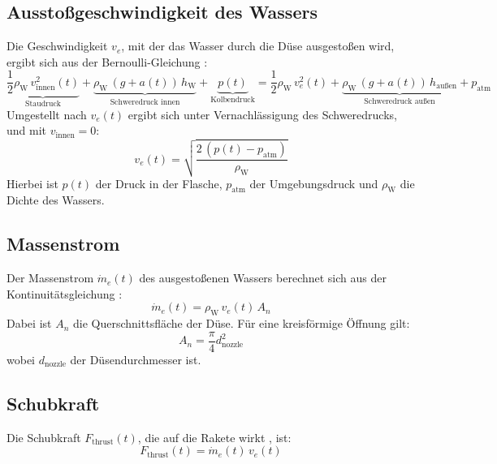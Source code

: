 \documentclass{SimSemBericht} %
\begin{document}
\subsection{Ausstoßgeschwindigkeit des Wassers}
Die Geschwindigkeit \(v_e\), mit der das Wasser durch die Düse ausgestoßen wird, ergibt sich aus der Bernoulli-Gleichung \cite{formelsammlung2024}: %
\begin{equation*}
    \underbrace{\frac{1}{2} \rho_{\mathrm{W}} \, v_{\text{innen}}^2(t)}_{\text{Staudruck}}
    + \underbrace{\rho_{\mathrm{W}} \, (g + a(t)) \, h_{\mathrm{W}}}_{\text{Schweredruck innen}}
    + \underbrace{p(t)}_{\text{Kolbendruck}}
    = \frac{1}{2} \rho_{\mathrm{W}} \, v_e^2(t)
    + \underbrace{\rho_{\mathrm{W}} \, (g + a(t)) \, h_{\text{außen}}}_{\text{Schweredruck außen}}
    + p_{\text{atm}}
\end{equation*}
Umgestellt nach \(v_e(t)\) ergibt sich unter Vernachlässigung des Schweredrucks, und mit \(v_{\text{innen}} = 0\):
\begin{equation}
v_e(t) = \sqrt{\frac{2\,(p(t) - p_{\text{atm}})}{\rho_{\mathrm{W}}}}
\end{equation}
Hierbei ist \(p(t)\) der Druck in der Flasche, \(p_{\text{atm}}\) der Umgebungsdruck und \(\rho_{\mathrm{W}}\) die Dichte des Wassers.

\subsection{Massenstrom}
Der Massenstrom \(\dot{m}_e(t)\) des ausgestoßenen Wassers berechnet sich aus der Kontinuitätsgleichung \cite{formelsammlung2024}: %
\begin{equation}
\dot{m}_e(t) = \rho_{\mathrm{W}} \, v_e(t) \, A_n
\end{equation}
Dabei ist \(A_n\) die Querschnittsfläche der Düse. Für eine kreisförmige Öffnung gilt:
\begin{equation*}
A_n = \frac{\pi}{4} d_{\text{nozzle}}^2
\end{equation*}
wobei \(d_{\text{nozzle}}\) der Düsendurchmesser ist.

\subsection{Schubkraft}
Die Schubkraft \(F_{\text{thrust}}(t)\), die auf die Rakete wirkt \cite{formelsammlung2024}, ist: %
\begin{equation}
F_{\text{thrust}}(t) = \dot{m}_e(t) \, v_e(t)
\end{equation}
\end{document}
